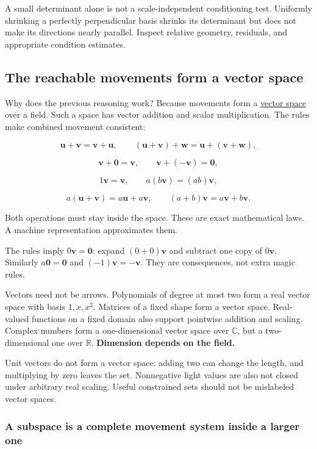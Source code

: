 A small determinant alone is not a scale-independent conditioning test. Uniformly shrinking a perfectly perpendicular basis shrinks its determinant but does not make its directions nearly parallel. Inspect relative geometry, residuals, and appropriate condition estimates.

\subsection{The reachable movements form a vector space}\label{the-reachable-movements-form-a-vector-space}

Why does the previous reasoning work? Because movements form a \hyperref[01-foundations-i-ch017]{vector space} over a field. Such a space has vector addition and scalar multiplication. The rules make combined movement consistent:

\[
\mathbf u+\mathbf v=\mathbf v+\mathbf u,\qquad
(\mathbf u+\mathbf v)+\mathbf w=\mathbf u+(\mathbf v+\mathbf w),
\]

\[
\mathbf v+\mathbf0=\mathbf v,\qquad
\mathbf v+(-\mathbf v)=\mathbf0,
\]

\[
1\mathbf v=\mathbf v,\qquad
a(b\mathbf v)=(ab)\mathbf v,
\]

\[
a(\mathbf u+\mathbf v)=a\mathbf u+a\mathbf v,\qquad
(a+b)\mathbf v=a\mathbf v+b\mathbf v.
\]

Both operations must stay inside the space. These are exact mathematical laws. A machine representation approximates them.

The rules imply \(0\mathbf v=\mathbf0\): expand \((0+0)\mathbf v\) and subtract one copy of \(0\mathbf v\). Similarly \(a\mathbf0=\mathbf0\) and \((-1)\mathbf v=-\mathbf v\). They are consequences, not extra magic rules.

Vectors need not be arrows. Polynomials of degree at most two form a real vector space with basis \(1,x,x^2\). Matrices of a fixed shape form a vector space. Real-valued functions on a fixed domain also support pointwise addition and scaling. Complex numbers form a one-dimensional vector space over \(\mathbb C\), but a two-dimensional one over \(\mathbb R\). \textbf{Dimension depends on the field.}

Unit vectors do not form a vector space: adding two can change the length, and multiplying by zero leaves the set. Nonnegative light values are also not closed under arbitrary real scaling. Useful constrained sets should not be mislabeled vector spaces.

\subsubsection{A subspace is a complete movement system inside a larger one}\label{a-subspace-is-a-complete-movement-system-inside-a-larger-one}

